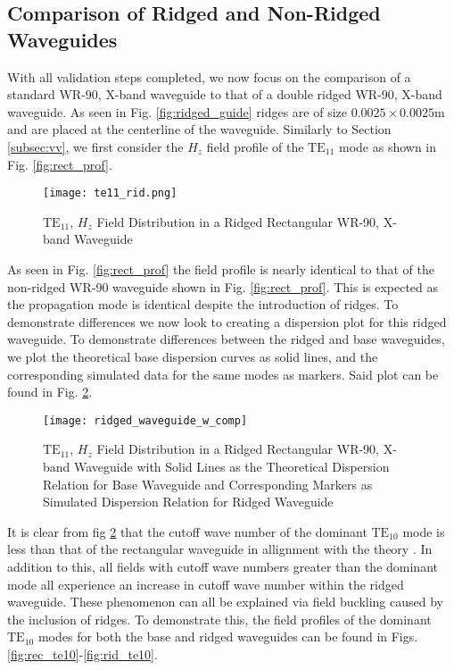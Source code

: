 \subsection{Comparison of Ridged and Non-Ridged Waveguides}
\label{subsec:rid_guides}
With all validation steps completed, we now focus on the comparison of a standard WR-90, X-band waveguide to that of a double ridged WR-90, X-band waveguide. As seen in Fig. \ref{fig:ridged_guide} ridges are of size $0.0025\times0.0025$m and are placed at the centerline of the waveguide. Similarly to Section \ref{subsec:vv}, we first consider the $H_z$ field profile of the $\mathrm{TE_{11}}$ mode as shown in Fig. \ref{fig:rect_prof}.

\begin{figure}[h!]  
	\centering
	\texttt{[image: te11\_rid.png]} 
	\caption{$\mathrm{TE_{11}}$, $H_z$ Field Distribution in a Ridged Rectangular WR-90, X-band Waveguide}
	\label{fig:rid_prof}
\end{figure}

As seen in Fig. \ref{fig:rect_prof} the field profile is nearly identical to that of the non-ridged WR-90 waveguide shown in Fig. \ref{fig:rect_prof}. This is expected as the propagation mode is identical despite the introduction of ridges. To demonstrate differences we now look to creating a dispersion plot for this ridged waveguide. To demonstrate differences between the ridged and base waveguides, we plot the theoretical base dispersion curves as solid lines, and the corresponding simulated data for the same modes as markers. Said plot can be found in Fig. \ref{fig:rid_disp}.

\begin{figure}[h!]  
	\centering
	\texttt{[image: ridged\_waveguide\_w\_comp]} 
	\caption{$\mathrm{TE_{11}}$, $H_z$ Field Distribution in a Ridged Rectangular WR-90, X-band Waveguide with Solid Lines as the Theoretical Dispersion Relation for Base Waveguide and Corresponding Markers as Simulated Dispersion Relation for Ridged Waveguide}
	\label{fig:rid_disp}
\end{figure}

It is clear from fig \ref{fig:rid_disp} that the cutoff wave number of the dominant $\mathrm{TE}_{10}$ mode is less than that of the rectangular waveguide in allignment with the theory \cite{pozar2011microwave}. In addition to this, all fields with cutoff wave numbers greater than the dominant mode all experience an increase in cutoff wave number within the ridged waveguide. These phenomenon can all be explained via field buckling caused by the inclusion of ridges. To demonstrate this, the field profiles of the dominant $\mathrm{TE}_{10}$ modes for both the base and ridged waveguides can be found in Figs. \ref{fig:rec_te10}-\ref{fig:rid_te10}.

